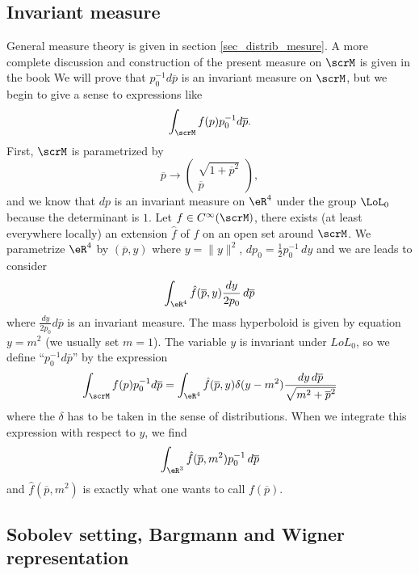\subsection{Invariant measure}

General measure theory is given in section \ref{sec_distrib_mesure}. A more complete discussion and construction of the present measure on $\scrM$ is given in the book \cite{Reed_Simon} We will prove that $p_0^{-1}d\overline{p}$ is an invariant measure on $\scrM$, but we begin to give a sense to expressions like
\[ 
  \int_{\scrM} f(p)p_0^{-1}d\overline{p}.
\]
First, $\scrM$ is parametrized by
\[ 
  \overline{p}\to
\begin{pmatrix}
\sqrt{1+\overline{p}^2}\\\overline{p}
\end{pmatrix},
\]
and we know that $dp$ is an invariant measure on $\eR^4$ under the group $\LoL_0$ because the determinant is $1$. Let $f\in C^{\infty}(\scrM)$, there exists (at least everywhere locally) an extension $\hat f$ of $f$ on an open set around $\scrM$. We parametrize $\eR^4$ by $(\overline{p},y)$ where $y=\| y \|^2$, $dp_0=\frac{ 1 }{2}p_0^{-1}\,dy$ and we are leads to consider
\[ 
  \int_{\eR^4}\hat f(\overline{p},y)\frac{ dy }{ 2p_0 }\,d\overline{p}
\]
where $\frac{ dy }{ 2p_0 }d\overline{p}$ is an invariant measure. The mass hyperboloid is given by equation $y=m^2$ (we usually set $m=1$). The variable $y$ is invariant under $LoL_0$, so we define ``$p_0^{-1}d\overline{p}$'' by the expression
\begin{equation}
  \int_{\scrM}f(p)p_0^{-1}d\overline{p}= \int_{\eR^4}\hat f(\overline{p},y)\delta(y-m^2)\frac{ dy\,d\overline{p} }{ \sqrt{m^2+\overline{p}^2} }
\end{equation}
where the $\delta$ has to be taken in the sense of distributions. When we integrate this expression with respect to $y$, we find
\[ 
  \int_{\eR^3}\hat f(\overline{p},m^2)p_0^{-1}\,d\overline{p}
\]
and $\hat f(\overline{p},m^2)$ is exactly what one wants to call $f(\overline{p})$.

\subsection{Sobolev setting, Bargmann and Wigner representation}

